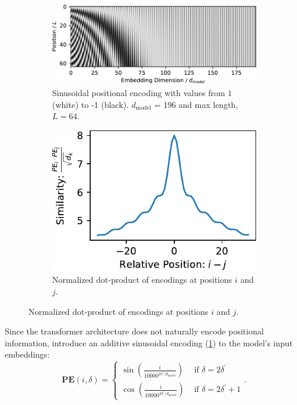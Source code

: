 \begin{figure}[ht]
    \centering
    \begin{subfigure}[t]{0.6\linewidth}
        \includegraphics[width=\linewidth]{figures/positional_encoding.pdf}
        \caption{Sinusoidal positional encoding with values from $1$ (white) to -1 (black). $d_\text{model}$ = 196 and max length, $L=64$.}
        \label{fig:positional-encoding}
    \end{subfigure}
    \hfill
    \begin{subfigure}[t]{0.35\linewidth}
        \includegraphics[width=\linewidth]{figures/positional_encoding_similarity.pdf}
        \caption{Normalized dot-product of encodings at positions $i$ and $j$.}
        \label{fig:positional-encoding-similarity}
    \end{subfigure}
\end{figure}
Since the transformer architecture does not naturally encode positional information, \cite{transformer2017} introduce an additive sinusoidal encoding (\cref{fig:positional-encoding}) to the model's input embeddings:
\begin{equation}
    \textbf{PE}(i, \delta)= \begin{cases}\sin \left(\frac{i}{10000^{2 \delta^{\prime} / d_\text{model}}}\right) & \text { if } \delta=2 \delta^{\prime} \\ \cos \left(\frac{i}{10000^{2 \delta^{\prime} / d_\text{model}}}\right) & \text { if } \delta=2 \delta^{\prime}+1\end{cases}.
\end{equation}
